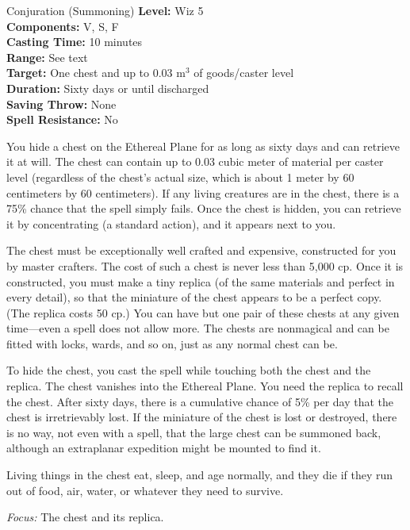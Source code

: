 {Conjuration (Summoning)}
{
	\textbf{Level:}
	Wiz 5\\
	\textbf{Components:}
	V, S, F\\
	\textbf{Casting Time:}
	10 minutes\\
	\textbf{Range:}
	See text\\
	\textbf{Target:}
	One chest and up to 0.03 m$^3$ of goods/caster level\\
	\textbf{Duration:}
	Sixty days or until discharged\\
	\textbf{Saving Throw:}
	None\\
	\textbf{Spell Resistance:}
	No\\
}
{
	You hide a chest on the Ethereal Plane for as long as sixty days and can retrieve it at will. The chest can contain up to 0.03 cubic meter of material per caster level (regardless of the chest's actual size, which is about 1 meter by 60 centimeters by 60 centimeters). If any living creatures are in the chest, there is a 75\% chance that the spell simply fails. Once the chest is hidden, you can retrieve it by concentrating (a standard action), and it appears next to you.

	The chest must be exceptionally well crafted and expensive, constructed for you by master crafters. The cost of such a chest is never less than 5,000 cp. Once it is constructed, you must make a tiny replica (of the same materials and perfect in every detail), so that the miniature of the chest appears to be a perfect copy. (The replica costs 50 cp.) You can have but one pair of these chests at any given time---even a  spell does not allow more. The chests are nonmagical and can be fitted with locks, wards, and so on, just as any normal chest can be.

	To hide the chest, you cast the spell while touching both the chest and the replica. The chest vanishes into the Ethereal Plane. You need the replica to recall the chest. After sixty days, there is a cumulative chance of 5\% per day that the chest is irretrievably lost. If the miniature of the chest is lost or destroyed, there is no way, not even with a  spell, that the large chest can be summoned back, although an extraplanar expedition might be mounted to find it.

	Living things in the chest eat, sleep, and age normally, and they die if they run out of food, air, water, or whatever they need to survive.

	\textit{Focus:}
	The chest and its replica.

}
